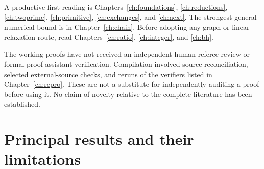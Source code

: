 A productive first reading is Chapters~\ref{ch:foundations}, \ref{ch:reductions},
\ref{ch:twoprime}, \ref{ch:primitive}, \ref{ch:exchanges}, and
\ref{ch:next}. The strongest general numerical bound is in
Chapter~\ref{ch:chain}. Before adopting any graph or linear-relaxation route,
read Chapters~\ref{ch:ratio}, \ref{ch:integer}, and \ref{ch:bh}.

The working proofs have not received an independent human referee review or
formal proof-assistant verification. Compilation involved source reconciliation,
selected external-source checks, and reruns of the verifiers listed in
Chapter~\ref{ch:repro}. These are not a substitute for independently auditing a
proof before using it. No claim of novelty relative to the complete literature
has been established.

\section{Principal results and their limitations}
\small
